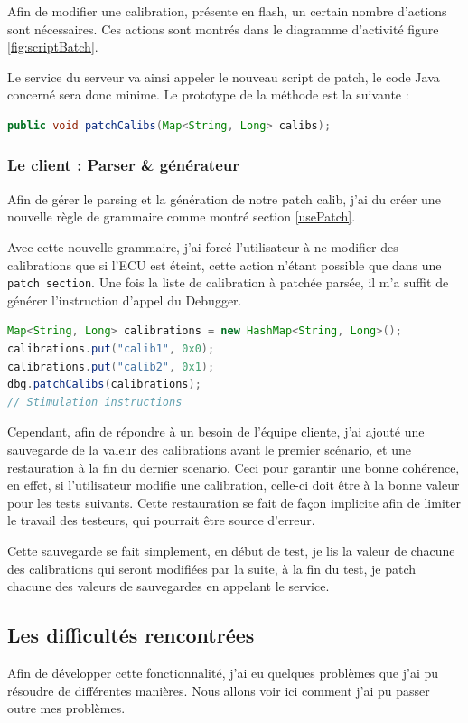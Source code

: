 	Afin de modifier une calibration, présente en flash, un certain nombre d'actions sont nécessaires. Ces actions sont montrés dans le diagramme d'activité figure \ref{fig:scriptBatch}.
	
	Le service du serveur va ainsi appeler le nouveau script de patch, le code Java concerné sera donc minime. Le prototype de la méthode est la suivante : 
	\begin{lstlisting}[language=Java, numbers=none]
public void patchCalibs(Map<String, Long> calibs);
	\end{lstlisting}

	\subsubsection{Le client : Parser \& générateur}
	Afin de gérer le parsing et la génération de notre patch calib, j'ai du créer une nouvelle règle de grammaire comme montré section \ref{usePatch}. 
	
	Avec cette nouvelle grammaire, j'ai forcé l'utilisateur à ne modifier des calibrations que si l'ECU est éteint, cette action n'étant possible que dans une \texttt{patch section}. Une fois la liste de calibration à patchée parsée, il m'a suffit de générer l'instruction d'appel du Debugger.
	
	\begin{lstlisting}[language=Java]
Map<String, Long> calibrations = new HashMap<String, Long>();
calibrations.put("calib1", 0x0);
calibrations.put("calib2", 0x1);
dbg.patchCalibs(calibrations);
// Stimulation instructions
	\end{lstlisting}
	
	Cependant, afin de répondre à un besoin de l'équipe cliente, j'ai ajouté une sauvegarde de la valeur des calibrations avant le premier scénario, et une restauration à la fin du dernier scenario. Ceci pour garantir une bonne cohérence, en effet, si l'utilisateur modifie une calibration, celle-ci doit être à la bonne valeur pour les tests suivants. Cette restauration se fait de façon implicite afin de limiter le travail des testeurs, qui pourrait être source d'erreur.
	
	Cette sauvegarde se fait simplement, en début de test, je lis la valeur de chacune des calibrations qui seront modifiées par la suite, à la fin du test, je patch chacune des valeurs de sauvegardes en appelant le service.
	
	\subsection{Les difficultés rencontrées}
	Afin de développer cette fonctionnalité, j'ai eu quelques problèmes que j'ai pu résoudre de différentes manières. Nous allons voir ici comment j'ai pu passer outre mes problèmes. 

